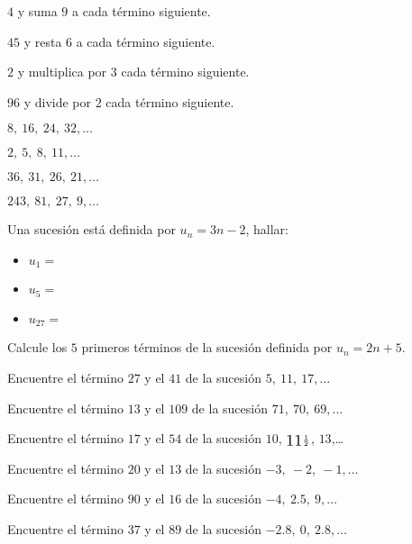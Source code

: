 \documentclass[12pt,addpoints,x11names]{exam}
\begin{document}
\begin{questions}

\begin{multicols}{2}


\question $4$ y suma $9$ a cada término siguiente.

\question $45$ y resta $6$ a cada término siguiente.

\question $2$ y multiplica por $3$ cada término siguiente.

\question $96$ y divide por $2$ cada término siguiente.



\question $8,\ 16,\ 24,\ 32,\ldots$

\question $2,\ 5,\ 8,\ 11,\ldots$

\question $36,\ 31,\ 26,\ 21,\ldots$

\question $243,\ 81,\ 27,\ 9,\ldots$



\question Una sucesión está definida por $u_n=3n-2$, hallar:
\begin{itemize}
  \item $u_1=$
  \item $u_5=$
  \item $u_{27}=$
\end{itemize}

\question Calcule los $5$ primeros términos de la sucesión definida por
$u_n=2n+5$.

\question Encuentre el término $27$ y el $41$ de la sucesión $5,\ 11,\ 17,\ldots$


\question Encuentre el término $13$ y el $109$ de la sucesión $71,\ 70,\ 69,\ldots$


\question Encuentre el término $17$ y el $54$ de la sucesión $10$,
$\scalerel{11}{\scriptstyle\frac{1}{2}}$, $13$,\ldots


\question Encuentre el término $20$ y el $13$ de la sucesión $-3,\ -2,\ -1,\ldots$


\question Encuentre el término $90$ y el $16$ de la sucesión $-4,\ 2.5,\ 9,\ldots$


\question Encuentre el término $37$ y el $89$ de la sucesión $-2.8,\ 0,\ 2.8,\ldots$




\end{multicols}
\end{questions}
\end{document}
